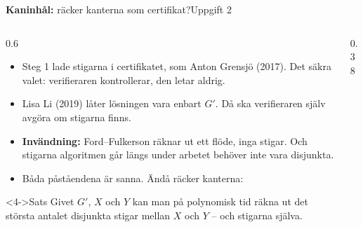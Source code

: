 \documentclass[aspectratio=169,10pt]{beamer}
\newcommand{\rabbit}{\textcolor{warnorange}{\textbf{Kaninhål:}} }
\begin{document}
\begin{frame}{\rabbit räcker kanterna som certifikat?}{Uppgift 2}
  \begin{columns}[T]
    \begin{column}{0.6\textwidth}
      \begin{itemize}
        \item<1-> Steg 1 lade stigarna i certifikatet, som Anton Grensjö (2017). Det säkra valet: verifieraren kontrollerar, den letar aldrig.
        \item<2-> Lisa Li (2019) låter lösningen vara enbart $G'$. Då ska verifieraren själv avgöra om stigarna finns.
        \item<3-> \textbf{Invändning:} Ford--Fulkerson räknar ut ett flöde, inga stigar. Och stigarna algoritmen går längs under arbetet behöver inte vara disjunkta.
        \item<4-> Båda påståendena är sanna. Ändå räcker kanterna:
      \end{itemize}
      \begin{block}<4->{Sats}
        Givet $G'$, $X$ och $Y$ kan man på polynomisk tid räkna ut det största antalet disjunkta stigar mellan $X$ och $Y$ -- och stigarna själva.
      \end{block}
    \end{column}
    \begin{column}{0.38\textwidth}
      \centering
    \end{column}
  \end{columns}
\end{frame}
\end{document}
